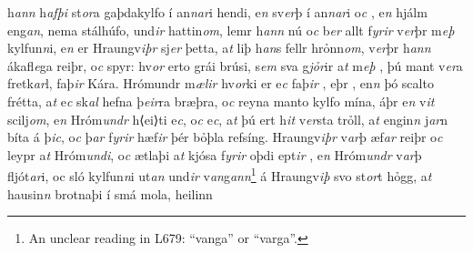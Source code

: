 h\textit{ann} h\textit{afþi} st\textit{or}a gaþdakylfo í an\textit{n}\textit{ar}i hendi,  e\textit{n} sv\textit{er}þ í an\textit{n}\textit{ar}i o\textit{c} , 
e\textit{n} hjálm eng\textit{an}, nema stálhúfo, 
und\textit{ir} hattin\textit{om}, lemr h\textit{ann} nú o\textit{c}
b\textit{er} allt   f\textit{yrir} v\textit{er}þr m\textit{eþ} kylfun\textit{n}i,
e\textit{n} er Hraungv\textit{iþr} sj\textit{er} þetta, a\textit{t} liþ
h\textit{an}s fellr hrỏnn\textit{om},  
v\textit{er}þr h\textit{ann} ákafl\textit{e}ga reiþr, o\textit{c} spyr: hv\textit{or} erto  grái   brúsi, s\textit{em} sva g\textit{jỏr}ir a\textit{t} 
 m\textit{eþ} , 
þú mant v\textit{er}a    fretk\textit{ar}l, faþ\textit{ir} Kára. 
Hrómundr m\textit{ælir} hv\textit{or}ki er e\textit{c} 
faþ\textit{ir} ,  eþr  , 
en\textit{n} þó  scalto   frétta, a\textit{t} e\textit{c} sk\textit{al} hefna þ\textit{eir}ra bræþra, o\textit{c} reyna manto kylfo mína, áþr e\textit{n}
v\textit{it} scilj\textit{om}, e\textit{n} Hróm\textit{undr} h⟨ei⟩ti e\textit{c}, o\textit{c}  e\textit{c}, a\textit{t} þú ert h\textit{it} v\textit{er}sta trỏll,
a\textit{t} engin\textit{n} j\textit{ar}n bíta á þ\textit{ic}, o\textit{c} þ\textit{ar} f\textit{yrir} hæf\textit{ir} þér bỏþla refsíng.
Hraungv\textit{iþr} v\textit{ar}þ æf\textit{ar} reiþr
o\textit{c} leypr a\textit{t} Hróm\textit{undi}, o\textit{c} ætlaþi  a\textit{t} kjósa   
f\textit{yrir}  oþdi  ept\textit{ir} , e\textit{n} Hróm\textit{undr} v\textit{ar}þ fljót\textit{ar}i, oc  sló kylfun\textit{n}i ut\textit{an} und\textit{ir} v\textit{an}g\textit{an}\textit{n}\footnote{An unclear reading in L679: \enquote{vanga} or \enquote{varga}.}  á Hraungv\textit{iþ} svo st\textit{or}t  hỏgg, a\textit{t} hausin\textit{n} brotnaþi í smá mola,   heilinn  

